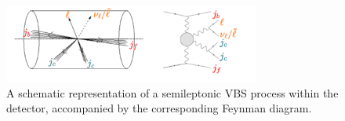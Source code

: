 \begin{figure}[tbp]
\centering
\includegraphics[width=0.75\textwidth]{figures/theory/semi_vbs.png}
\caption{
A schematic representation of a semileptonic VBS process within the detector, accompanied by the corresponding Feynman diagram.
}
\label{fig:semi_vbs}
\end{figure}


